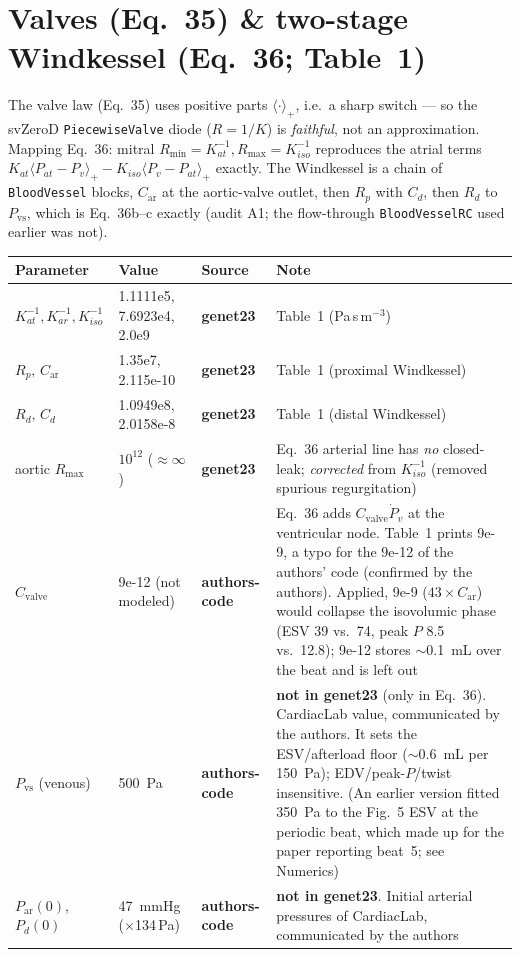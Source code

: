 \documentclass[10pt]{article}
\newcommand{\gen}{\textcolor{cgen}{\textbf{genet23}}}
\newcommand{\code}{\textcolor{ccode}{\textbf{authors-code}}}
\begin{document}
\section*{Valves (Eq.~35) \& two-stage Windkessel (Eq.~36; Table~1)}
The valve law (Eq.~35) uses positive parts $\langle\cdot\rangle_+$, i.e.\ a sharp
switch --- so the svZeroD \texttt{PiecewiseValve} diode ($R=1/K$) is \emph{faithful},
not an approximation. Mapping Eq.~36: mitral $R_{\min}{=}K_{at}^{-1},R_{\max}{=}K_{iso}^{-1}$
reproduces the atrial terms $K_{at}\langle P_{at}{-}P_v\rangle_+ - K_{iso}\langle P_v{-}P_{at}\rangle_+$ exactly.
The Windkessel is a chain of \texttt{BloodVessel} blocks,
$C_\text{ar}$ at the aortic-valve outlet, then $R_p$ with $C_d$, then $R_d$ to $P_\text{vs}$,
which is Eq.~36b--c exactly (audit A1; the flow-through \texttt{BloodVesselRC} used earlier was not).
\begin{longtable}{l l l P{6.4cm}}
\toprule Parameter & Value & Source & Note \\ \midrule\endhead
$K_{at}^{-1},K_{ar}^{-1},K_{iso}^{-1}$ & 1.1111e5, 7.6923e4, 2.0e9 & \gen & Table~1 (Pa\,s\,m$^{-3}$) \\
$R_p,\,C_\text{ar}$ & 1.35e7, 2.115e-10 & \gen & Table~1 (proximal Windkessel) \\
$R_d,\,C_d$ & 1.0949e8, 2.0158e-8 & \gen & Table~1 (distal Windkessel) \\
aortic $R_{\max}$ & $10^{12}$ ($\approx\infty$) & \gen & Eq.~36 arterial line has \emph{no} closed-leak; \emph{corrected} from $K_{iso}^{-1}$ (removed spurious regurgitation) \\
$C_\text{valve}$ & 9e-12 (not modeled) & \code & Eq.~36 adds $C_\text{valve}\dot P_v$ at the ventricular node. Table~1 prints 9e-9, a typo for the 9e-12 of the authors' code (confirmed by the authors). Applied, 9e-9 ($43\times C_\text{ar}$) would collapse the isovolumic phase (ESV 39 vs.\ 74, peak $P$ 8.5 vs.\ 12.8); 9e-12 stores $\sim$\SI{0.1}{mL} over the beat and is left out \\
$P_\text{vs}$ (venous) & \SI{500}{Pa} & \code & \textbf{not in genet23} (only in Eq.~36). CardiacLab value, communicated by the authors. It sets the ESV/afterload floor ($\sim$\SI{0.6}{mL} per \SI{150}{Pa}); EDV/peak-$P$/twist insensitive. (An earlier version fitted \SI{350}{Pa} to the Fig.~5 ESV at the periodic beat, which made up for the paper reporting beat~5; see Numerics) \\
$P_\text{ar}(0)$, $P_d(0)$ & \SI{47}{mmHg} ($\times$134\,Pa) & \code & \textbf{not in genet23}. Initial arterial pressures of CardiacLab, communicated by the authors \\
\bottomrule
\end{longtable}
\end{document}
